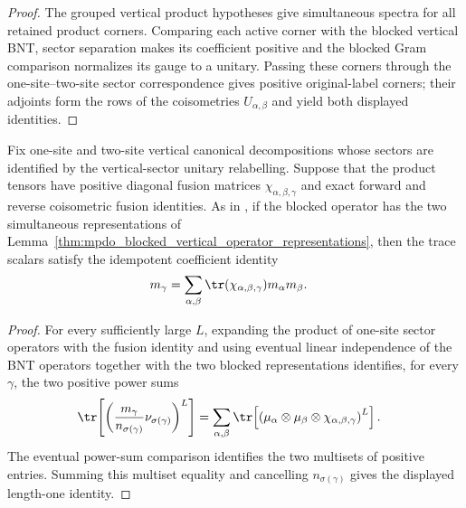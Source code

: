 \begin{proof}\leanok
    The grouped vertical product hypotheses give simultaneous spectra for all
    retained product corners. Comparing each active corner with the blocked
    vertical BNT, sector separation makes its coefficient positive and the
    blocked Gram comparison normalizes its gauge to a unitary. Passing these
    corners through the one-site--two-site sector correspondence gives
    positive original-label corners; their adjoints form the rows of the
    coisometries $U_{\alpha,\beta}$ and yield both displayed identities.
\end{proof}

\begin{lemma}
    \label{thm:mpdo_blocked_representations_idempotent_trace_scalars}
    \leanok
    Fix one-site and two-site vertical canonical decompositions whose sectors
    are identified by the vertical-sector unitary relabelling. Suppose that the
    product tensors have positive diagonal fusion matrices
    $\chi_{\alpha,\beta,\gamma}$ and exact forward and reverse coisometric
    fusion identities. As in
    \cite[Appendix~C.4, lines~2030--2042]{Cirac2016MPDO_arXiv}, if the blocked
    operator has the two simultaneous representations of
    Lemma~\ref{thm:mpdo_blocked_vertical_operator_representations}, then the
    trace scalars satisfy the idempotent coefficient identity
    \begin{align}
        m_\gamma
         & =\sum_{\alpha,\beta}
        \tr(\chi_{\alpha,\beta,\gamma})m_\alpha m_\beta.
        \notag
    \end{align}
\end{lemma}

\begin{proof}\leanok
    For every sufficiently large $L$, expanding the product of one-site sector
    operators with the fusion identity and using eventual linear independence
    of the BNT operators together with the two blocked representations
    identifies, for every $\gamma$, the two positive power sums
    \begin{align}
        \tr\!\left[
            \left(\frac{m_\gamma}{n_{\sigma(\gamma)}}
            \nu_{\sigma(\gamma)}\right)^L\right]
         & =
        \sum_{\alpha,\beta}
        \tr\!\left[
            \left(\mu_\alpha\otimes\mu_\beta\otimes
            \chi_{\alpha,\beta,\gamma}\right)^L\right].
        \notag
    \end{align}
    The eventual power-sum comparison identifies the two multisets of positive
    entries. Summing this multiset equality and cancelling
    $n_{\sigma(\gamma)}$ gives the displayed length-one identity.
\end{proof}

